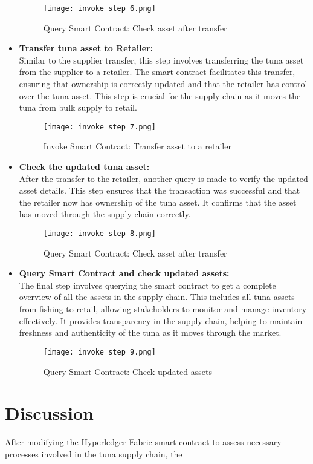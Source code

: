 \begin{itemize}
	\begin{figure}[H]
		\centering
		\texttt{[image: invoke step 6.png]}
		\caption{Query Smart Contract: Check asset after transfer}
		\label{fig: sixth step}
	\end{figure}
	
	\item \textbf{Transfer tuna asset to Retailer:}\\
	Similar to the supplier transfer, this step involves transferring the tuna asset from the supplier to a retailer. The smart contract facilitates this transfer, ensuring that ownership is correctly updated and that the retailer has control over the tuna asset. This step is crucial for the supply chain as it moves the tuna from bulk supply to retail.
	
	\begin{figure}[H]
		\centering
		\texttt{[image: invoke step 7.png]}
		\caption{Invoke Smart Contract: Transfer asset to a retailer}
		\label{fig: seventh step}
	\end{figure}
	
	\item \textbf{Check the updated tuna asset:}\\
	After the transfer to the retailer, another query is made to verify the updated asset details. This step ensures that the transaction was successful and that the retailer now has ownership of the tuna asset. It confirms that the asset has moved through the supply chain correctly.
	
	\begin{figure}[H]
		\centering
		\texttt{[image: invoke step 8.png]}
		\caption{Query Smart Contract: Check asset after transfer}
		\label{fig: eight step}
	\end{figure}
	
	\item \textbf{Query Smart Contract and check updated assets:}\\
	The final step involves querying the smart contract to get a complete overview of all the assets in the supply chain. This includes all tuna assets from fishing to retail, allowing stakeholders to monitor and manage inventory effectively. It provides transparency in the supply chain, helping to maintain freshness and authenticity of the tuna as it moves through the market.
	
	\begin{figure}[H]
		\centering
		\texttt{[image: invoke step 9.png]}
		\caption{Query Smart Contract: Check updated assets}
		\label{fig: ninth step}
	\end{figure}
	
		
	\end{itemize}
	
\section{Discussion}
After modifying the Hyperledger Fabric smart contract to assess necessary processes involved in the tuna supply chain, the 
